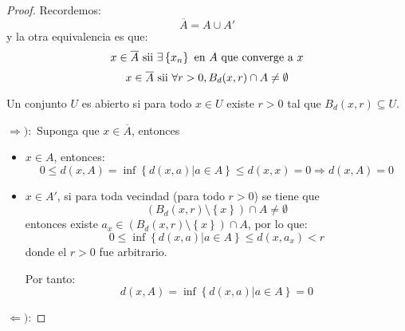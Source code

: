 \documentclass[12pt]{report}
\theoremstyle{largebreak}
\begin{document}
    \begin{proof}
        Recordemos:
        \begin{equation*}
            \overline{A}=A\cup A'
        \end{equation*}
        y la otra equivalencia es que:
        \begin{equation*}
            x\in\overline{A}\textup{ sii }\exists \left\{x_n \right\}\textup{ en }A \textup{ que converge a $x$}
        \end{equation*}
        \begin{equation*}
            x\in\overline{A}\textup{ sii }\forall r>0, B_d(x,r)\cap A\neq\emptyset
        \end{equation*}

        Un conjunto $U$ es abierto si para todo $x\in U$ existe $r>0$ tal que $B_d(x,r)\subseteq U$.

        \begin{center}
            
        \end{center}

        $\Rightarrow):$ Suponga que $x\in\overline{A}$, entonces
        \begin{itemize}
            \item $x\in A$, entonces:
            \begin{equation*}
                0\leq d(x,A)=\inf\left\{d(x,a)\Big|a\in A \right\}\leq d(x,x)=0
                \Rightarrow d(x,A)=0
            \end{equation*}
            \item $x\in A'$, si para toda vecindad (para todo $r>0$) se tiene que
            \begin{equation*}
                (B_d(x,r)\setminus\left\{x\right\})\cap A\neq\emptyset
            \end{equation*}
            entonces existe $a_x\in(B_d(x,r)\setminus\left\{x\right\})\cap A$, por lo que:
            \begin{equation*}
                0\leq\inf\left\{d(x,a)\Big|a\in A \right\}\leq d(x,a_x)<r
            \end{equation*}
            donde el $r>0$ fue arbitrario.

            Por tanto:
            \begin{equation*}
                d(x,A)=\inf\left\{d(x,a)\Big|a\in A \right\}=0
            \end{equation*}
        \end{itemize}

        $\Leftarrow)$: 
    \end{proof}
\end{document}
